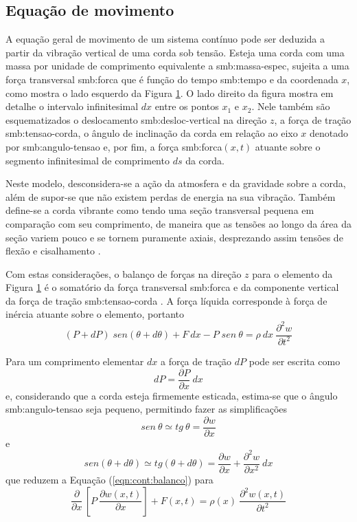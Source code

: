\documentclass[12pt,openright,oneside,a4paper,
	chapter=TITLE,section=TITLE,
	english,brazil]{abntex2}
\begin{document}
	\subsection{Equação de movimento} \label{desenv:cont:eqn-geral}
	A equação geral de movimento de um sistema contínuo pode ser deduzida a partir da vibração vertical de uma corda sob tensão. Esteja uma corda com uma massa por unidade de comprimento equivalente a \gls{smb:massa-espec}, sujeita a uma força transversal \gls{smb:forca} que é função do tempo \gls{smb:tempo} e da coordenada $x$, como mostra o lado esquerdo da Figura \ref{fig:vibracao-corda}. O lado direito da figura mostra em detalhe o intervalo infinitesimal $dx$ entre os pontos $x_1$ e $x_2$. Nele também são esquematizados o deslocamento \gls{smb:desloc-vertical} na direção $z$, a força de tração \gls{smb:tensao-corda}, o ângulo de inclinação da corda em relação ao eixo $x$ denotado por \gls{smb:angulo-tensao} e, por fim, a força \gls{smb:forca}$(x,t)$ atuante sobre o segmento infinitesimal de comprimento $ds$ da corda.
	\begin{figure}[t] 
	 \label{fig:vibracao-corda}
	\end{figure}

	Neste modelo, desconsidera-se a ação da atmosfera e da gravidade sobre a corda, além de supor-se que não existem perdas de energia na sua vibração. Também define-se a corda vibrante como tendo uma seção transversal pequena em comparação com seu comprimento, de maneira que as tensões ao longo da área da seção variem pouco e se tornem puramente axiais, desprezando assim tensões de flexão e cisalhamento \cite{clark:1972}.
	
	Com estas considerações, o balanço de forças na direção $z$ para o elemento da Figura \ref{fig:vibracao-corda} é o somatório da força transversal \gls{smb:forca} e da componente vertical da força de tração \gls{smb:tensao-corda} \cite{rao:2008}. A força líquida corresponde à força de inércia atuante sobre o elemento, portanto
	\begin{equation} \label{eqn:cont:balanco}
		(P + dP)\;sen(\theta + d\theta) + F\:dx - P\;sen\:\theta = \rho\:dx\:\frac{\partial^2 w}{\partial t^2}
	\end{equation}
	
	Para um comprimento elementar $dx$ a força de tração $dP$ pode ser escrita como \[dP = \frac{\partial P}{\partial x}\:dx\] e, considerando que a corda esteja firmemente esticada, estima-se que o ângulo \gls{smb:angulo-tensao} seja pequeno, permitindo fazer as simplificações \[sen\:\theta \simeq tg\:\theta = \frac{\partial w}{\partial x} \] e \[sen(\theta + d\theta) \simeq tg(\theta + d\theta) = \frac{\partial w}{\partial x} + \frac{\partial^2 w}{\partial x^2}\:dx \] que reduzem a Equação (\ref{eqn:cont:balanco}) para \[\frac{\partial}{\partial x}\,\left[P\:\frac{\partial w(x,t)}{\partial x}\right] + F(x,t) = \rho(x)\:\frac{\partial^2 w(x,t)}{\partial t^2} \]
	
\end{document}
